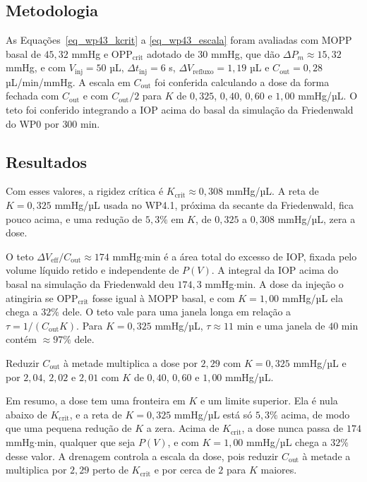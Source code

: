 \subsection{Metodologia}

As Equações~\ref{eq_wp43_kcrit} a \ref{eq_wp43_escala} foram avaliadas com MOPP basal de $45{,}32$ mmHg e $\mathrm{OPP}_{\text{crit}}$ adotado de $30$ mmHg, que dão $\Delta P_{m}\approx15{,}32$ mmHg, e com $V_{\text{inj}}=50$ µL, $\Delta t_{\text{inj}}=6$ s, $\Delta V_{\text{refluxo}}=1{,}19$ µL e $C_{\text{out}}=0{,}28$ µL/min/mmHg. A escala em $C_{\text{out}}$ foi conferida calculando a dose da forma fechada com $C_{\text{out}}$ e com $C_{\text{out}}/2$ para $K$ de $0{,}325$, $0{,}40$, $0{,}60$ e $1{,}00$ mmHg/µL. O teto foi conferido integrando a IOP acima do basal da simulação da Friedenwald do WP0 por $300$ min.

\subsection{Resultados}

Com esses valores, a rigidez crítica é $K_{\text{crit}}\approx0{,}308$ mmHg/µL. A reta de $K=0{,}325$ mmHg/µL usada no WP4.1, próxima da secante da Friedenwald, fica pouco acima, e uma redução de $5{,}3\%$ em $K$, de $0{,}325$ a $0{,}308$ mmHg/µL, zera a dose.

O teto $\Delta V_{\text{eff}}/C_{\text{out}}\approx174$ mmHg$\cdot$min é a área total do excesso de IOP, fixada pelo volume líquido retido e independente de $P(V)$. A integral da IOP acima do basal na simulação da Friedenwald deu $174{,}3$ mmHg$\cdot$min. A dose da injeção o atingiria se $\mathrm{OPP}_{\text{crit}}$ fosse igual à MOPP basal, e com $K=1{,}00$ mmHg/µL ela chega a $32\%$ dele. O teto vale para uma janela longa em relação a $\tau=1/(C_{\text{out}}K)$. Para $K=0{,}325$ mmHg/µL, $\tau\approx11$ min e uma janela de $40$ min contém $\approx97\%$ dele.

Reduzir $C_{\text{out}}$ à metade multiplica a dose por $2{,}29$ com $K=0{,}325$ mmHg/µL e por $2{,}04$, $2{,}02$ e $2{,}01$ com $K$ de $0{,}40$, $0{,}60$ e $1{,}00$ mmHg/µL.

Em resumo, a dose tem uma fronteira em $K$ e um limite superior. Ela é nula abaixo de $K_{\text{crit}}$, e a reta de $K=0{,}325$ mmHg/µL está só $5{,}3\%$ acima, de modo que uma pequena redução de $K$ a zera. Acima de $K_{\text{crit}}$, a dose nunca passa de $174$ mmHg$\cdot$min, qualquer que seja $P(V)$, e com $K=1{,}00$ mmHg/µL chega a $32\%$ desse valor. A drenagem controla a escala da dose, pois reduzir $C_{\text{out}}$ à metade a multiplica por $2{,}29$ perto de $K_{\text{crit}}$ e por cerca de $2$ para $K$ maiores.

